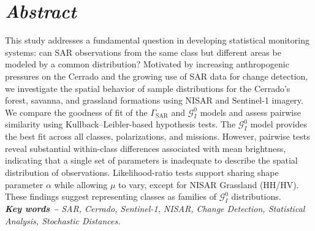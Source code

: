 \section*{\textit {Abstract}} %

This study addresses a fundamental question in developing statistical monitoring systems: can SAR observations from the same class but different areas be modeled by a common distribution? 
Motivated by increasing anthropogenic pressures on the Cerrado and the growing use of SAR data for change detection, we investigate the spatial behavior of sample distributions for the Cerrado’s forest, savanna, and grassland formations using NISAR and Sentinel-1 imagery. 
We compare the goodness of fit of the $\Gamma_{\text{SAR}}$ and $\mathcal{G}^0_I$ models and assess pairwise similarity using Kullback–Leibler-based hypothesis tests. 
The $\mathcal{G}^0_I$ model provides the best fit across all classes, polarizations, and missions. 
However, pairwise tests reveal substantial within-class differences associated with mean brightness, indicating that a single set of parameters is inadequate to describe the spatial distribution of observations. 
Likelihood-ratio tests support sharing shape parameter $\alpha$ while allowing $\mu$ to vary, except for NISAR Grassland (HH/HV).
These findings suggest representing classes as families of $\mathcal{G}^0_I$ distributions.
\\

\textit{\textbf{Key words --} %
SAR, Cerrado, Sentinel-1, NISAR, Change Detection, Statistical Analysis, Stochastic Distances. %
}